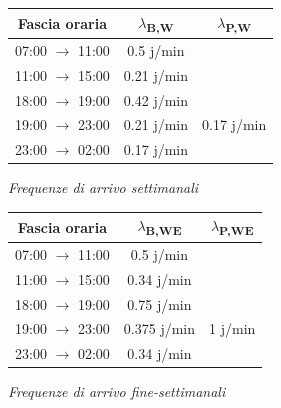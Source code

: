 \documentclass[a4paper, 12pt]{article}
\newcommand{\xmark}[0]{\ding{55}}
\begin{document}
\begin{minipage}{.5\textwidth}
\centering             
\begin{tabular}{ |c|c|c| }
	\hline
    \cellcolor{cellcolor} Fascia oraria & \cellcolor{cellcolor}$\lambda${\textsubscript{B,W}} & \cellcolor{cellcolor}$\lambda${\textsubscript{P,W}} \\
	\hline
    \hline

	07:00 $\rightarrow$ 11:00 & 0.5 j/min & \xmark \\

    \hline
    

	11:00 $\rightarrow$ 15:00 & 0.21 j/min & \xmark \\

    \hline
    

	18:00 $\rightarrow$ 19:00 & 0.42 j/min & \xmark \\

    \hline
    

	19:00 $\rightarrow$ 23:00 & 0.21 j/min & 0.17 j/min \\

    \hline
    

	23:00 $\rightarrow$ 02:00 & 0.17 j/min & \xmark \\

    \hline
\end{tabular}
\bigskip
              
\textit{Frequenze di arrivo settimanali}
\end{minipage}
%
\begin{minipage}{.5\textwidth}
\centering
\begin{tabular}{ |c|c|c| }
	\hline
    \cellcolor{cellcolor}Fascia oraria & \cellcolor{cellcolor}$\lambda${\textsubscript{B,WE}}
    &\cellcolor{cellcolor} $\lambda${\textsubscript{P,WE}} \\
    \hline
    \hline
    

	07:00 $\rightarrow$ 11:00 & 0.5 j/min & \xmark \\ 

    \hline
    

	11:00 $\rightarrow$ 15:00 & 0.34 j/min & \xmark \\

    \hline
    

	18:00 $\rightarrow$ 19:00 & 0.75 j/min & \xmark \\

    \hline
    

	19:00 $\rightarrow$ 23:00 & 0.375 j/min & 1 j/min \\

    \hline
    

	23:00 $\rightarrow$ 02:00 & 0.34 j/min & \xmark \\

    \hline
\end{tabular}
\bigskip
              
\textit{Frequenze di arrivo fine-settimanali} 
\end{minipage} 
\bigskip
\end{document}
